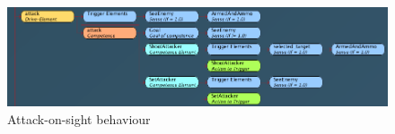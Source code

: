 \documentclass[a4paper,12pt]{article}
\begin{document}
\begin{figure}[h!]
	\centering
	\includegraphics[width=\linewidth]{additions2}
	\caption{Attack-on-sight behaviour}
	\label{fig:additions2}
\end{figure}
\end{document}
